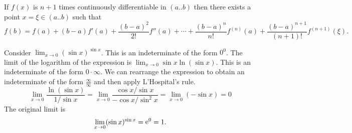 \begin{QuizSolution}
  \label{quiz solution taylor's theorem of the mean}
  If $f(x)$ is $n+1$ times continuously differentiable in $(a..b)$ 
  then there exists a point $x = \xi \in (a..b)$ such that
  \[
  f(b) = f(a) + (b-a) f'(a) + \frac{(b-a)^2}{2!} f''(a) + \cdots +
  \frac{(b-a)^n}{n!} f^{(n)}(a)
  + \frac{(b-a)^{n+1}}{(n+1)!} f^{(n+1)}(\xi).
  \]
\end{QuizSolution}


\begin{QuizSolution}
  \label{quiz solution lim sin sin}
  Consider $\lim_{x \to 0} (\sin x)^{\sin x}$.  This is an indeterminate of 
  the form $0^0$.  The limit of the logarithm of the expression is
  $\lim_{x \to 0} \sin x \ln( \sin x )$.
  This is an indeterminate of the form $0 \cdot \infty$.  We can rearrange
  the expression to obtain an indeterminate of the form $\frac{\infty}{\infty}$
  and then apply L'Hospital's rule.
  \[
  \lim_{x \to 0} \frac{\ln( \sin x )}{1/\sin x} 
  = \lim_{x \to 0} \frac{ \cos x / \sin x}{ -\cos x / \sin^2 x }
  = \lim_{x \to 0} (- \sin x)
  = 0
  \]
  The original limit is
  \[
  \lim_{x \to 0} (\sin x)^{\sin x} = \mathop{\mathrm{e}}\nolimits^0 = 1.
  \]
\end{QuizSolution}



\raggedbottom



